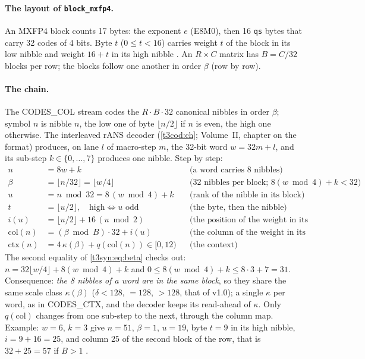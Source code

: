 \paragraph{The layout of \texttt{block\_mxfp4}.} An MXFP4 block counts 17 bytes: the exponent $e$ (E8M0), then 16 \texttt{qs} bytes that carry 32 codes of 4 bits. Byte $t$ ($0 \le t < 16$) carries weight $t$ of the block in its low nibble and weight $16 + t$ in its high nibble \parencite{gguf2026,ocpmx2023}. An $R \times C$ matrix has $B = C/32$ blocks per row; the blocks follow one another in order $\beta$ (row by row).

\paragraph{The chain.} The CODES\_COL stream codes the $R \cdot B \cdot 32$ canonical nibbles in order $\beta$; symbol $n$ is nibble $n$, the low one of byte $\lfloor n/2 \rfloor$ if $n$ is even, the high one otherwise. The interleaved rANS decoder (\cref{t3cod:ch}; Volume~II, chapter on the format) produces, on lane $l$ of macro-step $m$, the 32-bit word $w = 32m + l$, and its sub-step $k \in \{0, \dots, 7\}$ produces one nibble. Step by step:
\begin{align}
n &= 8w + k && \text{(a word carries 8 nibbles)} \label{t3syn:eq:n}\\
\beta &= \lfloor n/32 \rfloor = \lfloor w/4 \rfloor && \text{(32 nibbles per block; } 8(w \bmod 4) + k < 32\text{)} \label{t3syn:eq:beta}\\
u &= n \bmod 32 = 8\,(w \bmod 4) + k && \text{(rank of the nibble in its block)} \label{t3syn:eq:u}\\
t &= \lfloor u/2 \rfloor, \quad \text{high} \iff u \text{ odd} && \text{(the byte, then the nibble)} \nonumber\\
i(u) &= \lfloor u/2 \rfloor + 16\,(u \bmod 2) && \text{(the position of the weight in its block)} \label{t3syn:eq:i}\\
\mathrm{col}(n) &= (\beta \bmod B)\cdot 32 + i(u) && \text{(the column of the weight in its row)} \label{t3syn:eq:col}\\
\mathrm{ctx}(n) &= 4\,\kappa(\beta) + q(\mathrm{col}(n)) \in [0, 12) && \text{(the context)} \label{t3syn:eq:ctx}
\end{align}
The second equality of \eqref{t3syn:eq:beta} checks out: $n = 32\lfloor w/4\rfloor + 8(w \bmod 4) + k$ and $0 \le 8(w \bmod 4) + k \le 8 \cdot 3 + 7 = 31$. Consequence: \emph{the 8 nibbles of a word are in the same block}, so they share the same scale class $\kappa(\beta)$ ($\delta < 128$, $= 128$, $> 128$, that of v1.0); a single $\kappa$ per word, as in CODES\_CTX, and the decoder keeps its read-ahead of $\kappa$. Only $q(\mathrm{col})$ changes from one sub-step to the next, through the column map. Example: $w = 6$, $k = 3$ give $n = 51$, $\beta = 1$, $u = 19$, byte $t = 9$ in its high nibble, $i = 9 + 16 = 25$, and column $25$ of the second block of the row, that is $32 + 25 = 57$ if $B > 1$ \calc.

